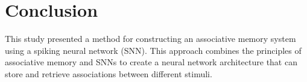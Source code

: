 \chapter{Conclusion}%


This study presented a method for constructing an associative memory system
using a spiking neural network (SNN). This approach combines the principles of
associative memory and SNNs to create a neural network architecture that can
store and retrieve associations between different stimuli.

